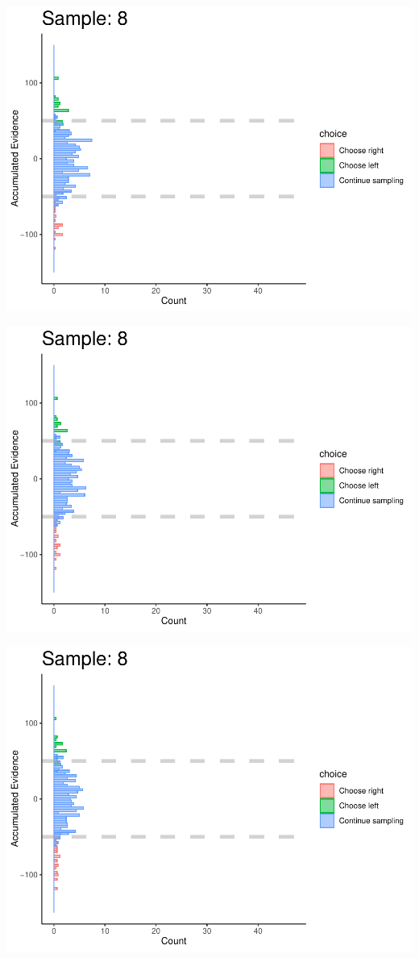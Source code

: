 \documentclass[
]{book}
\begin{document}
\begin{center}\includegraphics[width=0.8\linewidth]{LateNightBayes_files/figure-latex/fixed_check-76} \end{center}

\begin{center}\includegraphics[width=0.8\linewidth]{LateNightBayes_files/figure-latex/fixed_check-77} \end{center}

\begin{center}\includegraphics[width=0.8\linewidth]{LateNightBayes_files/figure-latex/fixed_check-78} \end{center}
\end{document}
